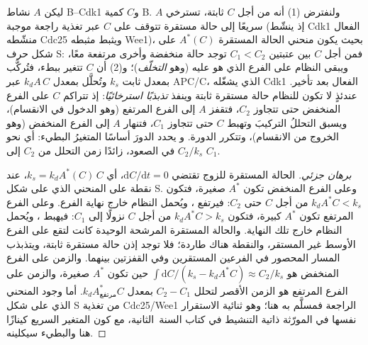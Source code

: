 \begin{theorem}\label{thm:b3:cell-cycle-apoptosis:oscillator}
ليكن $A$ نشاط  B--Cdk1 و$C$ كمية 
B. ولنفترض (1) أنه من أجل $C$ ثابتة، تسترخي $A$ سريعًا إلى حالة مستقرة
تتوقف على $C$ عبر تغذية راجعة موجبة (إذ ينشّط Cdk1 الفعال
منشّطه Cdc25 ويثبط مثبطه Wee1)، بحيث يكون
منحني الحالة المستقرة $A^{*}(C)$ على شكل حرف S: فمن أجل $C$ بين
عتبتين $C_{1} < C_{2}$ توجد حالة منخفضة وأخرى مرتفعة معًا، ويبقى
النظام على الفرع الذي هو عليه (وهو \emph{التخلّف})؛ و(2) أن $C$
تتغير ببطء، فتُركَّب بمعدل ثابت $k_{s}$ وتُحلَّل بمعدل
$k_{d}A\,C$ عبر APC/C، الذي يشغّله Cdk1 الفعال
بعد تأخير. عندئذٍ لا تكون للنظام حالة مستقرة ثابتة وينفذ
\emph{تذبذبًا استرخائيًا}: إذ تتراكم $C$ على الفرع المنخفض حتى
تتجاوز $C_{2}$، فتقفز $A$ إلى الفرع المرتفع (وهو الدخول في الانقسام)،
ويسبق التحللُ التركيبَ وتهبط $C$ حتى تتجاوز $C_{1}$، فتنهار $A$
إلى الفرع المنخفض (وهو الخروج من الانقسام)، وتتكرر الدورة. و
يحدد الدورَ أساسًا المتغيرُ البطيء: أي نحو $C_{2}/k_{s}$ في
الصعود، زائدًا زمن التحلل من $C_{2}$ إلى $C_{1}$.
\end{theorem}
\begin{proof}[برهان جزئي]
الحالة المستقرة للزوج تقتضي $\mathrm{d}C/\mathrm{d}t = 0$،
أي $k_{s} = k_{d}A^{*}(C)\,C$، عند نقطة على المنحني الذي على شكل S.
وعلى الفرع المنخفض تكون $A^{*}$ صغيرة، فتكون $k_{d}A^{*}C < k_{s}$ من أجل $C$ حتى
$C_{2}$: فيرتفع ، ويُحمل النظام خارج نهاية
الفرع. وعلى الفرع المرتفع تكون $A^{*}$ كبيرة، فتكون $k_{d}A^{*}C > k_{s}$ من أجل
$C$ نزولًا إلى $C_{1}$: فيهبط ، ويُحمل النظام خارج تلك
النهاية. والحالة المستقرة المرشحة الوحيدة كانت لتقع على الفرع
الأوسط غير المستقر، والنقطة هناك طاردة؛ فلا توجد إذن حالة مستقرة
ثابتة، ويتذبذب المسار المحصور في الفرعين المستقرين
وفي القفزتين بينهما. والزمن على الفرع المنخفض هو
$\int \mathrm{d}C/(k_{s} - k_{d}A^{*}C) \approx C_{2}/k_{s}$ حين تكون
$A^{*}$ صغيرة، والزمن على الفرع المرتفع هو الزمن الأقصر
لتحلل $C_{2} - C_{1}$ بمعدل $k_{d}A^{*}_{\text{مرتفع}}C$. أما
وجود المنحني الذي على شكل S من تغذية Cdc25/Wee1 الراجعة فمسلَّم
به هنا؛ وهو ثنائية الاستقرار نفسها في المورّثة ذاتية التنشيط
في كتاب السنة~الثانية، مع كون المتغير السريع كينازًا هنا والبطيء
سيكلينه.
\end{proof}

